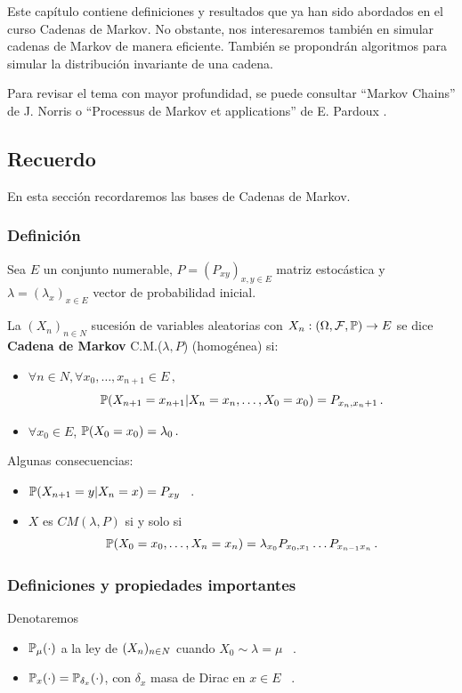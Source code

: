Este capítulo contiene definiciones y resultados que ya han sido abordados en el curso Cadenas de Markov. No obstante, nos interesaremos también en simular cadenas de Markov de manera eficiente. También se propondrán algoritmos para simular la distribución invariante de una cadena.

\newp Para revisar el tema con mayor profundidad, se puede consultar  ``Markov Chains'' de J. Norris \cite{norris} o ``Processus de Markov et applications'' de E. Pardoux \cite{pardoux}.
\subsection{Recuerdo}
En esta sección recordaremos las bases de Cadenas de Markov. 
\subsubsection{Definición}
\begin{definition}
Sea $E$ un conjunto numerable, $P=(P_{xy})_{x,y\in E}$ matriz estocástica y $\lambda=(\lambda_x)_{x\in E}$ vector de probabilidad inicial.

La $(X_n)_{n\in N}$ sucesión de variables aleatorias con $X_n:\edp \to E$ se dice \textbf{Cadena de Markov} C.M.($\lambda,P$) (homog\'enea) si:
\begin{itemize}
    \item $\forall n \in N, \forall x_0,\dots,x_{n+1}\in E \, ,$
    $$ \P(X_{n+1}=x_{n+1}|X_n=x_n,\dots,X_0=x_0) = P_{x_n,x_n+1} \, .$$
    \item $\forall x_0\in E$, $\P(X_0=x_0)=\lambda_0 \, .$
\end{itemize}
\end{definition}

\begin{property}
Algunas consecuencias:
\begin{itemize}
    \item $\P(X_{n+1}=y|X_n=x) = P_{xy}$ \, .
    \item $X$ es $CM(\lambda,P)$ si y solo si $$\P(X_0=x_0,\dots,X_n=x_n)=\lambda_{x_0}P_{x_0,x_1}\dots P_{x_{n-1}x_n}\, .$$
\end{itemize}
\end{property}

\subsubsection{Definiciones y propiedades importantes}
\begin{notation}
Denotaremos
\begin{itemize}
    \item $\P_\mu(\cdot)$ a la ley de $\xcm$ cuando $X_0\sim\lambda=\mu$ \, .
    \item $\P_x(\cdot)=\P_{\delta_x}(\cdot)$, con $\delta_x$ masa de Dirac en $x\in E$ \, .
\end{itemize}
\end{notation}

